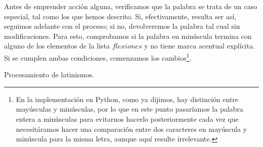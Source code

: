 Antes de emprender acción alguna, verificamos que la palabra se trata de un caso especial, tal como los que hemos descrito. Si, efectivamente, resulta ser así, seguimos adelante con el proceso; si no, devolveremos la palabra tal cual sin modificaciones. Para esto, comprobamos si la palabra en minúscula termina con alguno de los elementos de la lista $flexiones$ y no tiene marca acentual explícita. Si se cumplen  ambas condiciones, comenzamos los cambios\footnote{En la implementación en Python, como ya dijimos, hay distinción entre mayúsculas y minúsculas, por lo que en este punto pasaríamos la palabra entera a minúsculas para evitarnos hacerlo posteriormente cada vez que necesitáramos hacer una comparación entre dos caracteres en mayúscula y minúscula para la misma letra, aunque aquí resulte irrelevante.}.
\relax
\begin{algorithm}[!ht] %
	\caption{Procesamiento de latinismos.}\label{list:silabeadorlatin}
\end{algorithm}

